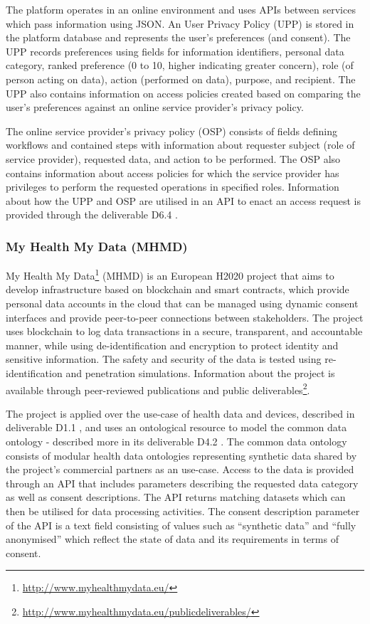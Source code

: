 The platform operates in an online environment and uses APIs between services which pass information using JSON. An User Privacy Policy (UPP) \cite{noauthor_d6.7_2017} is stored in the platform database and represents the user's preferences (and consent). The UPP records preferences using fields for information identifiers, personal data category, ranked preference (0 to 10, higher indicating greater concern), role (of person acting on data), action (performed on data), purpose, and recipient. The UPP also contains information on access policies created based on comparing the user's preferences against an online service provider's privacy policy. 

The online service provider's privacy policy (OSP) \cite{noauthor_d6.7_2017} consists of fields defining workflows and contained steps with information about requester subject (role of service provider), requested data, and action to be performed. The OSP also contains information about access policies for which the service provider has privileges to perform the requested operations in specified roles. Information about how the UPP and OSP are utilised in an API to enact an access request is provided through the deliverable D6.4 \cite{noauthor_d6.4_2017}.

\subsubsection{My Health My Data (MHMD)}
My Health My Data\footnote{\url{http://www.myhealthmydata.eu/}} (MHMD) is an European H2020 project that aims to develop infrastructure based on blockchain and smart contracts, which provide personal data accounts in the cloud that can be managed using dynamic consent interfaces and provide peer-to-peer connections between stakeholders. The project uses blockchain to log data transactions in a secure, transparent, and accountable manner, while using de-identification and encryption to protect identity and sensitive information. The safety and security of the data is tested using re-identification and penetration simulations.
Information about the project is available through peer-reviewed publications and public deliverables\footnote{\url{http://www.myhealthmydata.eu/publicdeliverables/}}.

The project is applied over the use-case of health data and devices, described in deliverable D1.1 \cite{noauthor_d1.1_2017}, and uses an ontological resource to model the common data ontology - described more in its deliverable D4.2 \cite{teodoro_d4.2_2018}. The common data ontology consists of modular health data ontologies representing synthetic data shared by the project's commercial partners as an use-case.
Access to the data is provided through an API that includes parameters describing the requested data category as well as consent descriptions. The API returns matching datasets which can then be utilised for data processing activities. The consent description parameter of the API is a text field consisting of values such as ``synthetic data'' and ``fully anonymised'' which reflect the state of data and its requirements in terms of consent. 

